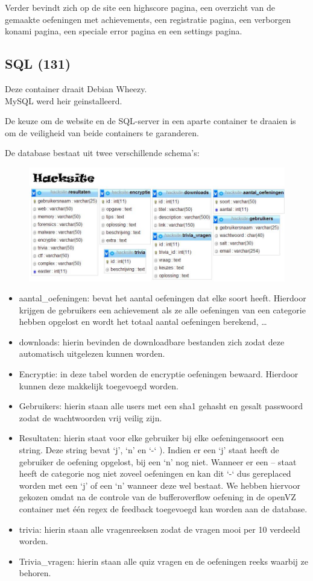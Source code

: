 Verder bevindt zich op de site een highscore pagina, een overzicht van de gemaakte oefeningen met achievements, een registratie pagina, een verborgen konami pagina, een speciale error pagina en een settings pagina.
\subsection{SQL (131)}
Deze container draait Debian Wheezy.\\
MySQL werd heir geinstalleerd.

De keuze om de website en de SQL-server in een aparte container te draaien is om de veiligheid van beide containers te garanderen.

De database bestaat uit twee verschillende schema’s:
\begin{figure}[H]
\centering
\includegraphics[scale=0.5]{systeem/db1.jpg}
\end{figure}
	\begin{itemize}
	\item aantal\_oefeningen: bevat het aantal oefeningen dat elke soort heeft. Hierdoor krijgen de gebruikers een achievement als ze alle oefeningen van een categorie hebben opgelost en wordt het totaal aantal oefeningen berekend, \ldots
	\item downloads: hierin bevinden de downloadbare bestanden zich zodat deze automatisch uitgelezen kunnen worden.
	\item Encryptie: in deze tabel worden de encryptie oefeningen bewaard. Hierdoor kunnen deze makkelijk toegevoegd worden.
	\item Gebruikers: hierin staan alle users met een sha1 gehasht en gesalt passwoord zodat de wachtwoorden vrij veilig zijn.
	\item Resultaten: hierin staat voor elke gebruiker bij elke oefeningensoort een string. Deze string bevat `j’, `n’ en `-‘ ). Indien er een `j’ staat heeft de gebruiker de oefening opgelost, bij een `n’ nog niet. Wanneer er een – staat heeft de categorie nog niet zoveel oefeningen en kan dit `-‘ dus gereplaced worden met een `j’ of een `n’ wanneer deze wel bestaat. We hebben hiervoor gekozen omdat na de controle van de bufferoverflow oefening in de openVZ container met één regex de feedback toegevoegd kan worden aan de database.
	\item trivia: hierin staan alle vragenreeksen zodat de vragen mooi per 10 verdeeld worden.
	\item Trivia\_vragen: hierin staan alle quiz vragen en de oefeningen reeks waarbij ze behoren.
	\end{itemize}
